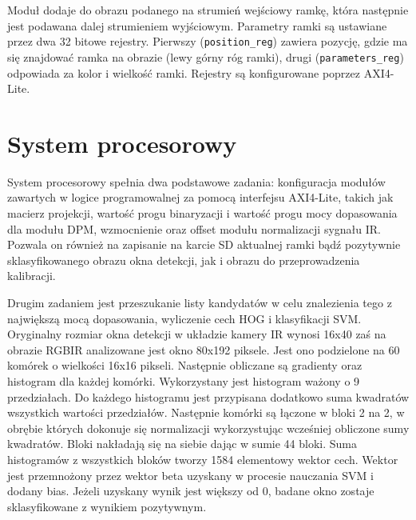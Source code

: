 Moduł dodaje do obrazu podanego na strumień wejściowy ramkę, która następnie jest podawana dalej strumieniem wyjściowym. %
Parametry ramki są ustawiane przez dwa 32 bitowe rejestry. 
Pierwszy  (\texttt{position\_reg}) zawiera pozycję, gdzie ma się znajdować ramka na obrazie (lewy górny róg ramki), drugi (\texttt{parameters\_reg}) odpowiada za kolor i wielkość ramki. 
Rejestry są konfigurowane poprzez AXI4-Lite.


\section{System procesorowy}

System procesorowy spełnia dwa podstawowe zadania: konfiguracja modułów zawartych w logice programowalnej za pomocą interfejsu AXI4-Lite, takich jak macierz projekcji, wartość progu binaryzacji i wartość progu mocy dopasowania dla modułu DPM, wzmocnienie oraz offset modułu normalizacji sygnału IR. %
Pozwala on również na zapisanie na karcie SD aktualnej ramki bądź pozytywnie sklasyfikowanego obrazu okna detekcji, jak i obrazu do przeprowadzenia kalibracji.

Drugim zadaniem jest przeszukanie listy kandydatów w celu znalezienia tego z największą mocą dopasowania, wyliczenie cech HOG i klasyfikacji SVM. 
Oryginalny rozmiar okna detekcji w układzie kamery IR wynosi 16x40 zaś na obrazie RGBIR analizowane jest okno 80x192 piksele. 
Jest ono podzielone na 60 komórek o wielkości 16x16 pikseli. 
Następnie obliczane są gradienty oraz histogram dla każdej komórki. 
Wykorzystany jest histogram ważony o 9 przedziałach. %
Do każdego histogramu jest przypisana dodatkowo suma kwadratów wszystkich wartości przedziałów. %
Następnie komórki są łączone w bloki 2 na 2, w obrębie których dokonuje się normalizacji wykorzystując wcześniej obliczone sumy kwadratów. 
Bloki nakładają się na siebie dając w sumie 44 bloki. %
Suma histogramów z wszystkich bloków tworzy 1584 elementowy wektor cech. 
Wektor jest przemnożony przez wektor beta uzyskany w procesie nauczania SVM i dodany bias. %
Jeżeli uzyskany wynik jest większy od 0, badane okno zostaje sklasyfikowane z wynikiem pozytywnym.



